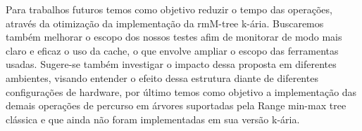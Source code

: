 Para trabalhos futuros temos como objetivo reduzir o tempo das operações, através da otimização da implementação da rmM-tree k-ária. Buscaremos também melhorar o escopo dos nossos testes afim de monitorar de 
modo mais claro e eficaz o uso da cache, o que envolve ampliar o escopo das ferramentas usadas. Sugere-se também investigar o impacto dessa proposta em diferentes ambientes, visando
entender o efeito dessa estrutura diante de diferentes configurações de hardware,
por último temos como objetivo a implementação das demais operações de percurso em árvores suportadas pela Range min-max tree clássica e que ainda não foram implementadas em sua versão k-ária. 
